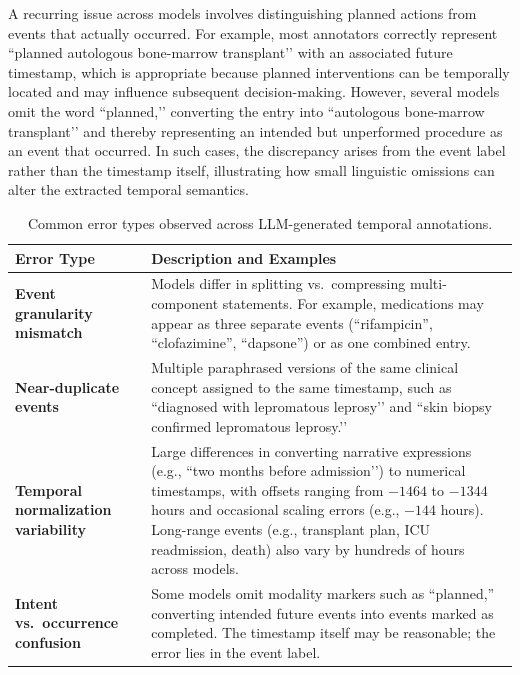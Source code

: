 A recurring issue across models involves distinguishing planned actions from events that actually occurred. For example, most annotators correctly represent “planned autologous bone-marrow transplant’’ with an associated future timestamp, which is appropriate because planned interventions can be temporally located and may influence subsequent decision-making. However, several models omit the word “planned,’’ converting the entry into “autologous
bone-marrow transplant’’ and thereby representing an intended but unperformed procedure as an event that occurred. In such cases, the discrepancy arises from the event label rather than the timestamp itself, illustrating how small linguistic omissions can alter the extracted temporal semantics.
\begin{table}[h!]
\centering
\caption{Common error types observed across LLM-generated temporal annotations.}
\label{tab:error_taxonomy}
\begin{tabular}{p{3.2cm} p{9cm}}
\toprule
\textbf{Error Type} & \textbf{Description and Examples} \\
\midrule

\textbf{Event granularity mismatch} 
& Models differ in splitting vs.\ compressing multi-component statements. 
For example, medications may appear as three separate events (``rifampicin'', ``clofazimine'', ``dapsone'') or as one combined entry. \\[6pt]

\textbf{Near-duplicate events} 
& Multiple paraphrased versions of the same clinical concept assigned to the same timestamp, such as 
``diagnosed with lepromatous leprosy’’ and 
``skin biopsy confirmed lepromatous leprosy.’’ \\[6pt]

\textbf{Temporal normalization variability} 
& Large differences in converting narrative expressions (e.g., ``two months before admission’’) to numerical timestamps, with offsets ranging from $-1464$ to $-1344$ hours and occasional scaling errors (e.g., $-144$ hours). Long-range events (e.g., transplant plan, ICU readmission, death) also vary by hundreds of hours across models. \\[6pt]

\textbf{Intent vs.\ occurrence confusion} 
& Some models omit modality markers such as ``planned,'' converting intended future events into events marked as completed. 
The timestamp itself may be reasonable; the error lies in the event label. \\[6pt]


\end{tabular}
\end{table}
